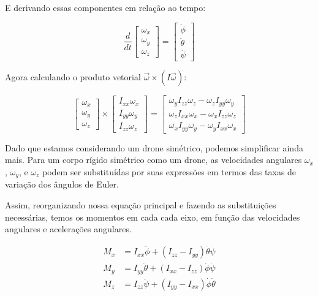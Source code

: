E derivando essas componentes em relação ao tempo:

\begin{equation}
	\frac{d}{dt}
	\begin{bmatrix}
	\omega_x \\
	\omega_y \\
	\omega_z
	\end{bmatrix}
	=
	\begin{bmatrix}
	\ddot{\phi} \\
	\ddot{\theta} \\
	\ddot{\psi}
	\end{bmatrix}
	\end{equation}

Agora calculando o produto vetorial $\vec{\omega} \times (I \vec{\omega})$:

\[
\begin{bmatrix}
\omega_x \\
\omega_y \\
\omega_z
\end{bmatrix}
\times
\begin{bmatrix}
I_{xx} \omega_x \\
I_{yy} \omega_y \\
I_{zz} \omega_z
\end{bmatrix}
=
\begin{bmatrix}
\omega_y I_{zz} \omega_z - \omega_z I_{yy} \omega_y \\
\omega_z I_{xx} \omega_x - \omega_x I_{zz} \omega_z \\
\omega_x I_{yy} \omega_y - \omega_y I_{xx} \omega_x
\end{bmatrix}
\]

Dado que estamos considerando um drone simétrico, podemos simplificar ainda mais. Para um corpo rígido simétrico como um drone, as velocidades angulares 
$\omega_x$, $\omega_y$, e $\omega_z$ podem ser substituídas por suas expressões em termos das taxas de variação dos ângulos de Euler.

Assim, reorganizando nossa equação principal e fazendo as substituições necessárias, temos os momentos em cada cada eixo, em função das velocidades angulares e acelerações angulares. 

\begin{align*}
	M_x &= I_{xx} \ddot{\phi} + (I_{zz} - I_{yy}) \dot{\theta} \dot{\psi} \\
	M_y &= I_{yy} \ddot{\theta} + (I_{xx} - I_{zz}) \dot{\phi} \dot{\psi} \\
	M_z &= I_{zz} \ddot{\psi} + (I_{yy} - I_{xx}) \dot{\phi} \dot{\theta}
\end{align*}

